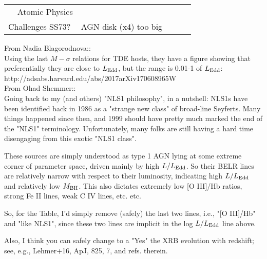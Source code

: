 \documentclass[11pt]{article}
\begin{document}
\begin{table}
\begin{center}
\begin{tabular}{lcccr}
$\;\;\;\;$Atomic Physics                    & & & \\
Challenges SS73?              & AGN disk (x4) too big      &     &     \\
        \hline
        \hline 
     \end{tabular}
  \end{center}
\end{table}



\clearpage
\normalsize
From Nadia Blagorodnova:: \\ 
Using the last $M-\sigma$ relations for TDE
hosts, they have a figure showing that preferentially they are close
to $L_{\rm Edd}$, but the range is 0.01-1 of $L_{\rm Edd}$:
http://adsabs.harvard.edu/abs/2017arXiv170608965W \\

\medskip \medskip
From Ohad Shemmer:: \\
Going back to my (and others) "NLS1 philosophy", in a nutshell:
NLS1s have been identified back in 1986 as a "strange new class"
of broad-line Seyferts. Many things happened since then, and 1999
should have pretty much marked the end of the "NLS1" terminology.
Unfortunately, many folks are still having a hard time disengaging from
this exotic "NLS1 class".

These sources are simply understood as type 1 AGN lying at some
extreme corner of parameter space, driven mainly by high $L/L_{\rm
Edd}$.  So their BELR lines are relatively narrow with respect to
their luminosity, indicating high $L/L_{\rm Edd}$ and relatively low
$M_{\rm BH}$. This also dictates extremely low [O III]/Hb ratios, strong Fe II
lines, weak C IV lines, etc. etc.

So, for the Table, I'd simply remove (safely) the last two lines,
i.e., "[O III]/Hb" and "like NLS1", since these two lines are implicit
in the log $L/L_{\rm Edd}$ line above.

Also, I think you can safely change to a "Yes" the XRB evolution
with redshift; see, e.g., Lehmer+16, ApJ, 825, 7, and refs. therein.



%
%
\end{document}
